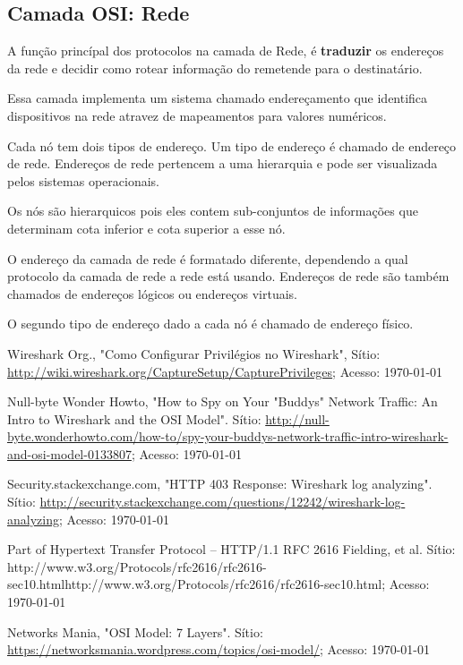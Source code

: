 \documentclass[13pt, a4paper]{article}
\begin{document}
\subsection{Camada OSI: Rede}

A função princípal dos protocolos na camada de Rede, é \textbf{traduzir} os endereços da rede e decidir como rotear informação do remetende para o destinatário.

Essa camada implementa um sistema chamado endereçamento que identifica dispositivos na rede atravez de mapeamentos para valores numéricos.

Cada nó tem dois tipos de endereço. Um tipo de endereço é chamado de endereço de rede. Endereços de rede pertencem a uma hierarquia e pode ser visualizada pelos sistemas operacionais.

Os nós são hierarquicos pois eles contem sub-conjuntos de informações que determinam cota inferior e cota superior a esse nó.

O endereço da camada de rede é formatado diferente, dependendo a qual protocolo da camada de rede a rede está usando. Endereços de rede são também chamados de endereços lógicos ou endereços virtuais.

O segundo tipo de endereço dado a cada nó é chamado de endereço físico. \cite{osi}


\pagebreak
\begin{thebibliography}{unstr}

 Wireshark Org., "Como Configurar Privilégios no Wireshark", Sítio: \href{http://wiki.wireshark.org/CaptureSetup/CapturePrivileges}
{http://wiki.wireshark.org/CaptureSetup/CapturePrivileges}; Acesso: \today

 Null-byte Wonder Howto, "How to Spy on Your "Buddys" Network Traffic: An Intro to Wireshark and the OSI Model". Sítio:
\href{http://null-byte.wonderhowto.com/how-to/spy-your-buddys-network-traffic-intro-wireshark-and-osi-model-0133807}
{http://null-byte.wonderhowto.com/how-to/spy-your-buddys-network-traffic-intro-wireshark-and-osi-model-0133807}; Acesso: \today

 Security.stackexchange.com, "HTTP 403 Response: Wireshark log analyzing". Sítio: \href{http://security.stackexchange.com/questions/12242/wireshark-log-analyzing}
{http://security.stackexchange.com/questions/12242/wireshark-log-analyzing}; Acesso: \today

 Part of Hypertext Transfer Protocol -- HTTP/1.1 RFC 2616 Fielding, et al. Sítio: {http://www.w3.org/Protocols/rfc2616/rfc2616-sec10.html}{http://www.w3.org/Protocols/rfc2616/rfc2616-sec10.html}; Acesso: \today

 Networks Mania,  "OSI Model: 7 Layers". Sítio: \href{https://networksmania.wordpress.com/topics/osi-model/}{https://networksmania.wordpress.com/topics/osi-model/}; Acesso: \today

\end{thebibliography}
\end{document}
